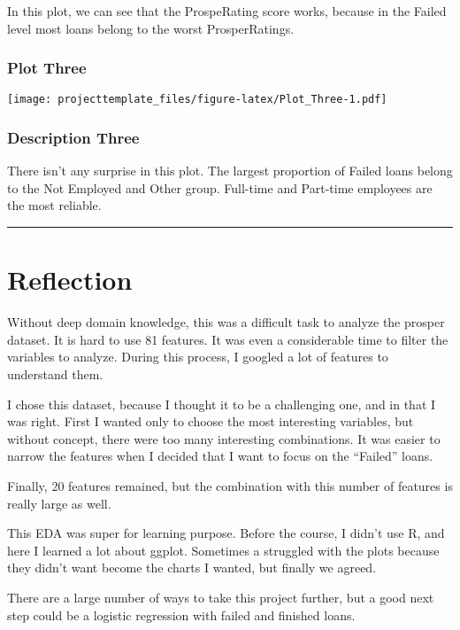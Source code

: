 \documentclass[]{article}
\begin{document}
In this plot, we can see that the ProspeRating score works, because in
the Failed level most loans belong to the worst ProsperRatings.

\subsubsection{Plot Three}\label{plot-three}

\texttt{[image: projecttemplate\_files/figure-latex/Plot\_Three-1.pdf]}

\subsubsection{Description Three}\label{description-three}

There isn't any surprise in this plot. The largest proportion of Failed
loans belong to the Not Employed and Other group. Full-time and
Part-time employees are the most reliable.

\begin{center}\rule{0.5\linewidth}{\linethickness}\end{center}

\section{Reflection}\label{reflection}

Without deep domain knowledge, this was a difficult task to analyze the
prosper dataset. It is hard to use 81 features. It was even a
considerable time to filter the variables to analyze. During this
process, I googled a lot of features to understand them.

I chose this dataset, because I thought it to be a challenging one, and
in that I was right. First I wanted only to choose the most interesting
variables, but without concept, there were too many interesting
combinations. It was easier to narrow the features when I decided that I
want to focus on the ``Failed'' loans.

Finally, 20 features remained, but the combination with this number of
features is really large as well.

This EDA was super for learning purpose. Before the course, I didn't use
R, and here I learned a lot about ggplot. Sometimes a struggled with the
plots because they didn't want become the charts I wanted, but finally
we agreed.

There are a large number of ways to take this project further, but a
good next step could be a logistic regression with failed and finished
loans.
\end{document}
